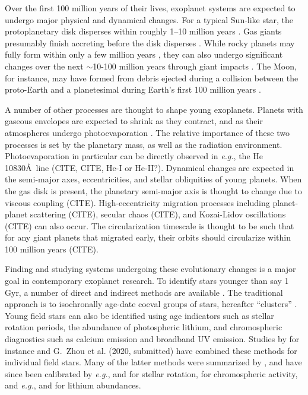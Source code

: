 \documentclass[12pt,twocolumn,tighten]{aastex63}
\begin{document}
Over the first 100 million years of their lives, exoplanet
systems are expected to undergo major physical and dynamical changes.
For a typical Sun-like star, the protoplanetary disk disperses within
roughly 1--10 million years
\citep{mamajek_initial_2009,dullemond_inner_2010,williams_protoplanetary_2011}.
Gas giants presumably finish accreting before the disk
disperses \citep{pollack_formation_1996}.  While rocky planets may
fully form within only a few million years
\citep{dauphas_hf-w-th_2011}, they can also undergo significant
changes over the next $\sim$10-100 million years through giant impacts
\citep[{\it
e.g.},][]{kleine_hf-w_2009,konig_earths_2011,raymond_terrestrial_2014}.
The Moon, for instance, may have formed from debris ejected during a
collision between the proto-Earth and a planetesimal
during Earth's first 100 million years
\citep{cameron_origin_1976,canup_origin_2001}.

A number of other processes are thought to shape young exoplanets.
Planets with gaseous envelopes are expected to shrink as they
contract, and as their atmospheres undergo photoevaporation
\citep[{\it
e.g.},][]{Fortney_et_al_2007,Owen_Wu_2013,Fulton_et_al_2017}.  The
relative importance of these two processes is set by the planetary
mass, as well as the radiation environment.  Photoevaporation in
particular can be directly observed in {\it e.g.}, the He 10830\AA\
line (CITE, CITE, He-I or He-II?).  Dynamical changes are expected in
the semi-major axes, eccentricities, and stellar obliquities of young
planets.  When the gas disk is present, the planetary semi-major axis
is thought to change due to viscous coupling (CITE).
High-eccentricity migration processes including planet-planet
scattering (CITE), secular chaos (CITE), and Kozai-Lidov oscillations
(CITE) can also occur.  The circularization timescale is thought to be
such that for any giant planets that migrated early, their orbits
should circularize within 100 million years (CITE).

Finding and studying systems undergoing these evolutionary changes is
a major goal in contemporary exoplanet research.  To identify stars
younger than say 1$\,$Gyr, a number of direct and indirect methods are
available \citep{soderblom_ages_2010}.  The traditional approach is to
isochronally age-date coeval groups of stars, hereafter ``clusters''
\citep[{\it
e.g.},][]{lada_embedded_2003,zuckerman_young_2004,krumholz_star_2019}.
Young field stars can also be identified using age indicators such as
stellar rotation periods, the abundance of photospheric lithium, and
chromospheric diagnostics such as calcium emission and broadband UV
emission.  Studies by for instance \citet{david_discovery_2018} and
G{.}~Zhou et al. (2020, submitted) have combined these methods for
individual field stars.  Many of the latter methods were summarized by
\citet{mamajek_improved_2008}, and have since been calibrated by {\it
e.g.},
\citet{barnes_color-period_2015,meibom_spin-down_2015,angus_calibrating_2015}
and \citet{curtis_tess_2019} for stellar rotation,
\citet{zerjal_chromospherically_2017} for chromospheric activity, and
{\it e.g.}, \citet{berger_identifying_2018} and
\citet{zerjal_galah_2019} for lithium abundances.
\end{document}
